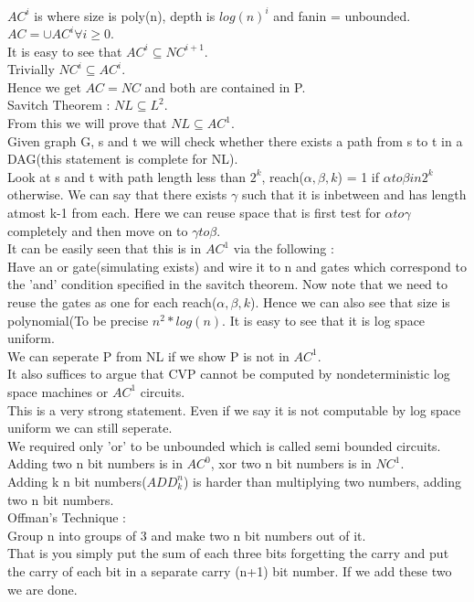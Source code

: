 \documentclass[solution,addpoints,12pt]{exam}
\begin{document}
${AC}^i$ is where size is poly(n), depth is ${log(n)}^i$
and fanin = unbounded.\\
$AC = \cup {AC}^i \forall i \ge 0$.\\
It is easy to see that ${AC}^{i} \subseteq {NC}^{i+1}$.\\
Trivially ${NC}^i \subseteq {AC}^i$.\\
Hence we get $AC = NC$ and both are contained in P.\\
Savitch Theorem : $NL \subseteq {L}^2$.\\
From this we will prove that $NL \subseteq {AC}^1$.\\
Given graph G, s and t we will check whether there
exists a path from s to t in a DAG(this statement is complete
for NL).\\
Look at s and t with path length less than $2^k$,
reach($\alpha, \beta, k$) = 1  if $\alpha to \beta in 2^k$
otherwise. We can say that there exists $\gamma$ such that
it is inbetween and has length atmost k-1 from each.
Here we can reuse space that is first test for $\alpha to \gamma$
completely and then move on to $\gamma to \beta$.\\
It can be easily seen that this is in ${AC}^1$ via the
following :\\
Have an or gate(simulating exists) and wire it to
n and gates which correspond to the 'and' condition
specified in the savitch theorem. Now note that we need
to reuse the gates as one for each
reach($\alpha, \beta, k$). Hence we can also see that size is
polynomial(To be precise $n^2*log(n)$. It is easy to see that
it is log space uniform.\\
We can seperate P from NL if we show P is not in ${AC}^1$.\\
It also suffices to argue that CVP cannot be computed by
nondeterministic log space machines or ${AC}^1$ circuits.\\
This is a very strong statement. Even if we say it is not
computable by log space uniform we can still seperate.\\
We required only 'or' to be unbounded which is called semi
bounded circuits.\\

Adding two n bit numbers is in ${AC}^0$, xor two n bit numbers
is in ${NC}^1$.\\
Adding k n bit numbers(${ADD}_{k}^{n}$) is harder than multiplying two numbers,
adding two n bit numbers.\\
Offman's Technique :\\
Group n into groups of 3 and make two n bit numbers out of it.\\
That is you simply put the sum of each three bits forgetting the carry
and put the carry of each bit in a separate carry (n+1) bit number. If
we add these two we are done.\\
\end{document}
